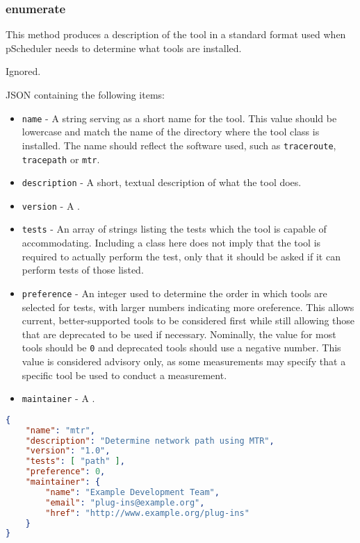 \documentclass[10pt,titlepage]{article}
\begin{document}
\subsubsection{enumerate}

This method produces a description of the tool in a standard format
used when pScheduler needs to determine what tools are installed.

 Ignored.

 JSON containing the following items:
\begin{itemize}
\item{\tt name} - A string serving as a short name for the tool.  This
  value should be lowercase and match the name of the directory where
  the tool class is installed.  The name should reflect the software
  used, such as {\tt traceroute}, {\tt tracepath} or {\tt mtr}.
\item{\tt description} - A short, textual description of what the tool
  does.
\item{\tt version} - A .
\item{\tt tests} - An array of strings listing the tests which the
  tool is capable of accommodating.  Including a class here does not
  imply that the tool is required to actually perform the test, only
  that it should be asked if it can perform tests of those listed.
\item{\tt preference} - An integer used to determine the order in
  which tools are selected for tests, with larger numbers indicating
  more oreference.  This allows current, better-supported tools to be
  considered first while still allowing those that are deprecated to
  be used if necessary.  Nominally, the value for most tools should be
  {\tt 0} and deprecated tools should use a negative number.  This
  value is considered advisory only, as some measurements may specify
  that a specific tool be used to conduct a measurement.
\item{\tt maintainer} - A .
\end{itemize}

\example
\begin{lstlisting}[language=json,firstnumber=1]
{
    "name": "mtr",
    "description": "Determine network path using MTR",
    "version": "1.0",
    "tests": [ "path" ],
    "preference": 0,
    "maintainer": {
        "name": "Example Development Team",
        "email": "plug-ins@example.org",
        "href": "http://www.example.org/plug-ins"
    }
}
\end{lstlisting}
\end{document}
